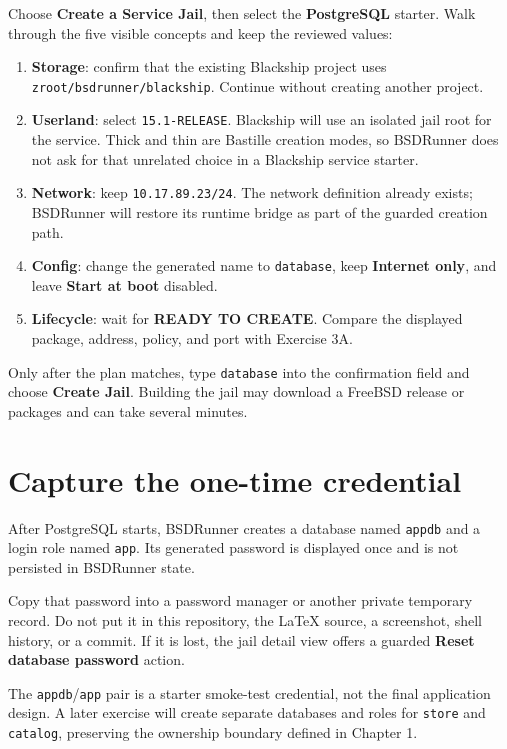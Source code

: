 Choose \textbf{Create a Service Jail}, then select the \textbf{PostgreSQL}
starter. Walk through the five visible concepts and keep the reviewed values:

\begin{enumerate}
  \item \textbf{Storage}: confirm that the existing Blackship project uses
    \texttt{zroot/bsdrunner/blackship}. Continue without creating another
    project.
  \item \textbf{Userland}: select \texttt{15.1-RELEASE}. Blackship will use an
    isolated jail root for the service. Thick and thin are Bastille creation
    modes, so BSDRunner does not ask for that unrelated choice in a Blackship
    service starter.
  \item \textbf{Network}: keep \texttt{10.17.89.23/24}. The network definition
    already exists; BSDRunner will restore its runtime bridge as part of the
    guarded creation path.
  \item \textbf{Config}: change the generated name to \texttt{database}, keep
    \textbf{Internet only}, and leave \textbf{Start at boot} disabled.
  \item \textbf{Lifecycle}: wait for \textbf{READY TO CREATE}. Compare the
    displayed package, address, policy, and port with Exercise 3A.
\end{enumerate}

Only after the plan matches, type \texttt{database} into the confirmation field
and choose \textbf{Create Jail}. Building the jail may download a FreeBSD
release or packages and can take several minutes.

\section{Capture the one-time credential}

After PostgreSQL starts, BSDRunner creates a database named \texttt{appdb} and a
login role named \texttt{app}. Its generated password is displayed once and is
not persisted in BSDRunner state.

Copy that password into a password manager or another private temporary record.
Do not put it in this repository, the LaTeX source, a screenshot, shell history,
or a commit. If it is lost, the jail detail view offers a guarded
\textbf{Reset database password} action.

The \texttt{appdb}/\texttt{app} pair is a starter smoke-test credential, not the
final application design. A later exercise will create separate databases and
roles for \texttt{store} and \texttt{catalog}, preserving the ownership boundary
defined in Chapter 1.

